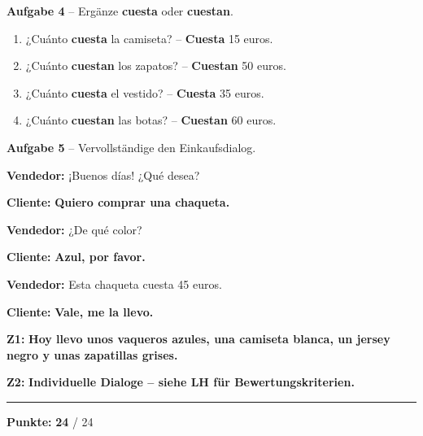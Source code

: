 \documentclass[11pt, a4paper]{article}
\newcommand{\fachfarbe}{spanisch}
\newcommand{\maxpunkte}{24}
\newcommand{\punktebox}[1]{\hfill\fbox{\small #1/#1}}
\newcommand{\lsg}[1]{\textcolor{loesung}{\textbf{#1}}}
\newcommand{\es}[1]{\textcolor{\fachfarbe}{\textbf{#1}}}
\begin{document}
\vspace{8pt}


\textbf{\textcolor{\fachfarbe}{Aufgabe 4}} -- Ergänze \es{cuesta} oder \es{cuestan}. \punktebox{4}

\vspace{3pt}

\begin{enumerate}[label=\alph*), nosep, itemsep=4pt]
    \item ¿Cuánto \lsg{cuesta} la camiseta? -- \lsg{Cuesta} 15 euros.
    \item ¿Cuánto \lsg{cuestan} los zapatos? -- \lsg{Cuestan} 50 euros.
    \item ¿Cuánto \lsg{cuesta} el vestido? -- \lsg{Cuesta} 35 euros.
    \item ¿Cuánto \lsg{cuestan} las botas? -- \lsg{Cuestan} 60 euros.
\end{enumerate}

\vspace{8pt}


\textbf{\textcolor{\fachfarbe}{Aufgabe 5}} -- Vervollständige den Einkaufsdialog. \punktebox{4}

\vspace{3pt}

\noindent
\textbf{Vendedor:} ¡Buenos días! ¿Qué desea?

\textbf{Cliente:} \lsg{Quiero comprar una chaqueta.}

\textbf{Vendedor:} ¿De qué color?

\textbf{Cliente:} \lsg{Azul, por favor.}

\textbf{Vendedor:} Esta chaqueta cuesta 45 euros.

\textbf{Cliente:} \lsg{Vale, me la llevo.}

\vspace{10pt}


\begin{tcolorbox}[colback=white, colframe=spanisch, boxrule=1pt, arc=0pt, title=\textbf{Zusatzaufgaben -- Beispiellösungen}]
\small
\textbf{Z1:} \lsg{Hoy llevo unos vaqueros azules, una camiseta blanca, un jersey negro y unas zapatillas grises.}

\vspace{0.5em}

\textbf{Z2:} \lsg{Individuelle Dialoge -- siehe LH für Bewertungskriterien.}
\end{tcolorbox}

\vspace{8pt}

\hrule
\vspace{5pt}

\begin{flushright}
\textbf{Punkte:} \lsg{\maxpunkte} / \maxpunkte
\end{flushright}
\end{document}
